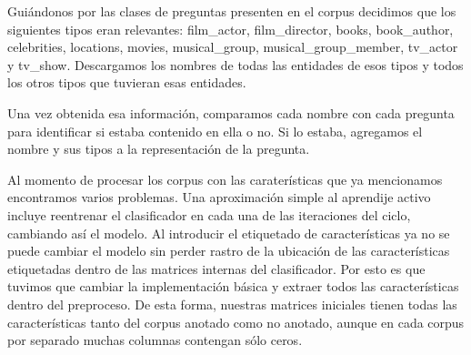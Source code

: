 Guiándonos por las clases de preguntas presenten en el corpus decidimos que los siguientes tipos eran relevantes: film\_actor, film\_director, books, book\_author, celebrities, locations, movies, musical\_group, musical\_group\_member, tv\_actor y tv\_show. Descargamos los nombres de todas las entidades de esos tipos y todos los otros tipos que tuvieran esas entidades.

Una vez obtenida esa información, comparamos cada nombre con cada pregunta para identificar si estaba contenido en ella o no. Si lo estaba, agregamos el nombre y sus tipos a la representación de la pregunta.

Al momento de procesar los corpus con las caraterísticas que ya mencionamos encontramos varios problemas. Una aproximación simple al aprendije activo incluye reentrenar el clasificador en cada una de las iteraciones del ciclo, cambiando así el modelo. Al introducir el etiquetado de características ya no se puede cambiar el modelo sin perder rastro de la ubicación de las características etiquetadas dentro de las matrices internas del clasificador. Por esto es que tuvimos que cambiar la implementación básica y extraer todos las características dentro del preproceso. De esta forma, nuestras matrices iniciales tienen todas las características tanto del corpus anotado como no anotado, aunque en cada corpus por separado muchas columnas contengan sólo ceros.



